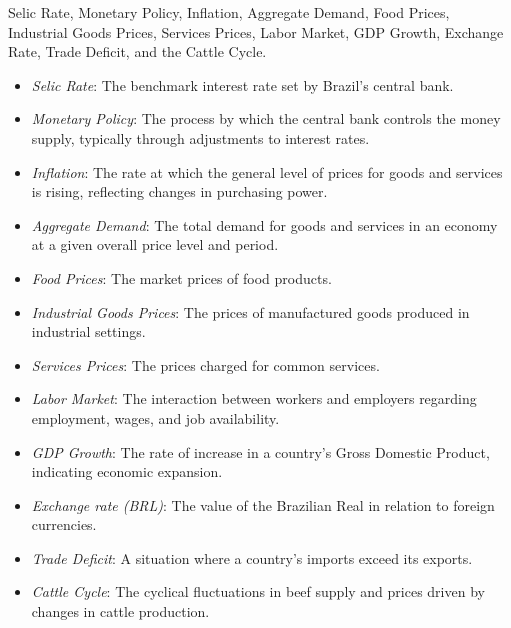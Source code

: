  Selic Rate, Monetary Policy, Inflation, Aggregate Demand, Food Prices, Industrial Goods Prices, Services Prices, Labor Market, GDP Growth, Exchange Rate, Trade Deficit, and the Cattle Cycle.

\begin{itemize}
    \item \emph{Selic Rate}: The benchmark interest rate set by Brazil's central bank.
    \item \emph{Monetary Policy}: The process by which the central bank controls the money supply, typically through adjustments to interest rates.
    \item \emph{Inflation}: The rate at which the general level of prices for goods and services is rising, reflecting changes in purchasing power.
    \item \emph{Aggregate Demand}: The total demand for goods and services in an economy at a given overall price level and period.
    \item \emph{Food Prices}: The market prices of food products.
    \item \emph{Industrial Goods Prices}: The prices of manufactured goods produced in industrial settings.
    \item \emph{Services Prices}: The prices charged for common services.
    \item \emph{Labor Market}: The interaction between workers and employers regarding employment, wages, and job availability.
    \item \emph{GDP Growth}: The rate of increase in a country's Gross Domestic Product, indicating economic expansion.
    \item \emph{Exchange rate (BRL)}: The value of the Brazilian Real in relation to foreign currencies.
    \item \emph{Trade Deficit}: A situation where a country's imports exceed its exports.
    \item \emph{Cattle Cycle}: The cyclical fluctuations in beef supply and prices driven by changes in cattle production.
\end{itemize}


